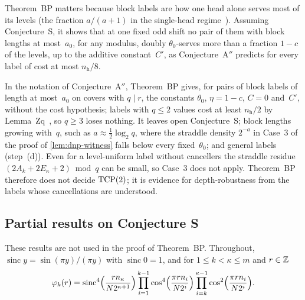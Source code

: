 Theorem~BP matters because block labels are how one head alone serves most of its levels (the fraction $a/(a+1)$ in the
single-head regime~\cite[Lemma~5.12]{BoundedNesting2026}). Assuming Conjecture~S, it shows that at one fixed odd shift no
pair of them with block lengths at most~$a_0$, for any modulus, doubly $\theta_0$-serves more than a fraction $1-c$ of the
levels, up to the additive constant~$C'$, as Conjecture~A$''$ predicts for every label of cost at most $n_{\mathrm h}/8$.

\begin{remark}\label{rem:dnp-scope}
In the notation of Conjecture~A$''$, Theorem~BP gives, for pairs of block labels of length at most~$a_0$ on covers with
$q\mid r$, the constants $\theta_0$, $\eta=1-c$, $C=0$ and~$C'$, without the cost hypothesis; labels with $q\le2$ values
cost at least $n_{\mathrm h}/2$ by Lemma~Zq~\cite[Lemma~2.7]{BoundedNesting2026}, so $q\ge3$ loses nothing. It leaves
open Conjecture~S; block lengths growing with~$q$, such as $a\approx\frac12\log_2q$, where the straddle density $2^{-a}$ in
Case~3 of the proof of \cref{lem:dnp-witness} falls below every fixed~$\theta_0$; and general labels (step~(d)). Even for a
level-uniform label without cancellers the straddle residue $(2A_k+2E_\kappa+2)\bmod q$ can be small, so Case~3 does not
apply. Theorem~BP therefore does not decide $\mathrm{TCP}(2)$; it is evidence for depth-robustness from the labels whose
cancellations are understood.
\end{remark}

\subsection{Partial results on Conjecture S}\label{sec:dnp-partial}

These results are not used in the proof of Theorem~BP. Throughout, $\operatorname{sinc}y=\sin(\pi y)/(\pi y)$ with
$\operatorname{sinc}0=1$, and for $1\le k<\kappa\le m$ and $r\in\mathbb{Z}$
\[
  \varphi_k(r)=\operatorname{sinc}^4\Bigl(\frac{rn_\kappa}{N2^{\kappa+1}}\Bigr)
  \prod_{i=1}^{k-1}\cos^4\Bigl(\frac{\pi rn_i}{N2^i}\Bigr)\prod_{i=k}^{\kappa-1}\cos^2\Bigl(\frac{\pi rn_i}{N2^i}\Bigr).
\]

